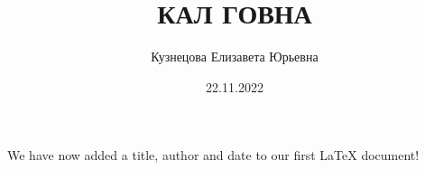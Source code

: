 \documentclass[12pt, letterpaper, twoside]{article}
\title{КАЛ ГОВНА}
\author{Кузнецова Елизавета Юрьевна}
\date{22.11.2022}
\begin{document}
\maketitle
We have now added a title, author and date to our first \LaTeX{} document!
\end{document}
